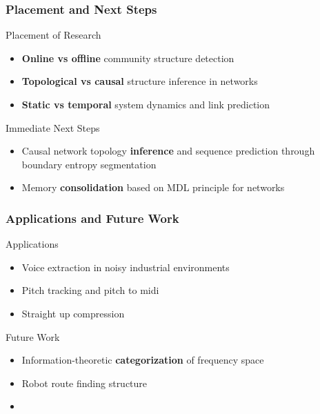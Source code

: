 \begin{frame}
  \frametitle{Placement and Next Steps}
  \begin{block}{Placement of Research}
    \begin{itemize}
      \item \textbf{Online vs offline} community structure detection 
      \item \textbf{Topological vs causal} structure inference in networks
      \item \textbf{Static vs temporal} system dynamics and link prediction 
    \end{itemize}
  \end{block}
  \begin{block}{Immediate Next Steps}
    \begin{itemize}
      \item Causal network topology \textbf{inference} and sequence prediction through boundary entropy segmentation
      \item Memory \textbf{consolidation} based on MDL principle for networks
    \end{itemize}
  \end{block}
\end{frame}

\begin{frame}
  \frametitle{Applications and Future Work}
  \begin{block}{Applications}
    \begin{itemize}
      \item Voice extraction in noisy industrial environments
      \item Pitch tracking and pitch to midi
      \item Straight up compression
    \end{itemize}
  \end{block}
  \begin{block}{Future Work}
    \begin{itemize}
      \item Information-theoretic \textbf{categorization} of frequency space
      \item Robot route finding structure
      \item 
    \end{itemize}
  \end{block}
\end{frame}
